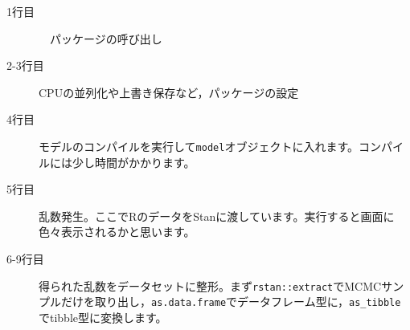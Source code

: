 \begin{description}
	\item[1行目]　パッケージの呼び出し
	\item[2-3行目] CPUの並列化や上書き保存など，パッケージの設定
	\item[4行目] モデルのコンパイルを実行して\texttt{model}オブジェクトに入れます。コンパイルには少し時間がかかります。
	\item[5行目] 乱数発生。ここでRのデータをStanに渡しています。実行すると画面に色々表示されるかと思います。
	\item[6-9行目] 得られた乱数をデータセットに整形。まず\texttt{rstan::extract}でMCMCサンプルだけを取り出し，\texttt{as.data.frame}でデータフレーム型に，\verb|as_tibble|でtibble型に変換します。
\end{description}
